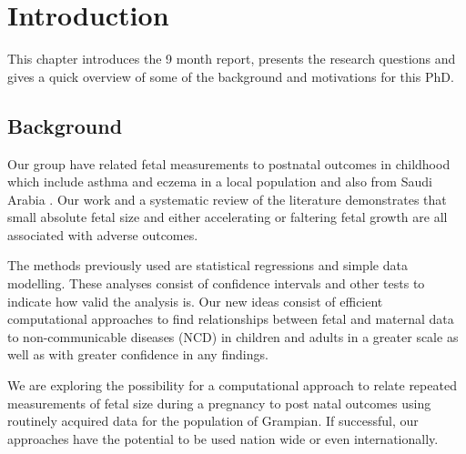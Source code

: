 \documentclass[bsc]{abdnthesis}
\begin{document}
\clearpage
\setcounter{page}{1}

\chapter{Introduction}
This chapter introduces the 9 month report, presents the research questions and gives a quick overview of some of the background and motivations for this PhD. 
\section{Background} %
\label{sec:background}
Our group  have related fetal measurements to postnatal outcomes in childhood which include asthma and eczema in a local population \cite{turner1, turner2, turner3} and also from Saudi Arabia \cite{ saudi}.  Our work and a systematic review of the literature demonstrates that small absolute fetal size and either accelerating or faltering fetal growth are all associated with adverse outcomes. 

The methods previously used are statistical regressions and simple data modelling. These analyses consist of confidence intervals and other tests to indicate how valid the analysis is. Our new ideas consist of efficient computational approaches to find relationships between fetal and maternal data to non-communicable diseases (NCD) in children and adults in a greater scale as well as with greater confidence in any findings.



We are exploring the possibility for a computational approach to relate repeated measurements of fetal size during a pregnancy to post natal outcomes using routinely acquired data for the population of Grampian. If successful, our approaches have the potential to be used nation wide or even internationally. 
\end{document}
